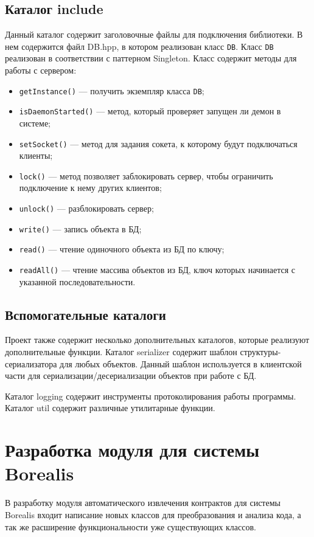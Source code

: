 \subsection{Каталог include}
Данный каталог содержит заголовочные файлы для подключения библиотеки. В нем содержится файл DB.hpp, в котором реализован класс \texttt{DB}. Класс \texttt{DB} реализован в соответствии с паттерном Singleton\cite{patterns}. Класс содержит методы для работы с сервером:
\begin{itemize}
\item \texttt{getInstance()} --- получить экземпляр класса \texttt{DB};
\item \texttt{isDaemonStarted()} --- метод, который проверяет запущен ли демон в системе;
\item \texttt{setSocket()} --- метод для задания сокета, к которому будут подключаться клиенты;
\item \texttt{lock()} --- метод позволяет заблокировать сервер, чтобы ограничить подключение к нему других клиентов;
\item \texttt{unlock()} --- разблокировать сервер;
\item \texttt{write()} --- запись объекта в БД;
\item \texttt{read()} --- чтение одиночного объекта из БД по ключу;
\item \texttt{readAll()} --- чтение массива объектов из БД, ключ которых начинается с указанной последовательности.
\end{itemize}


\subsection{Вспомогательные каталоги}
Проект также содержит несколько дополнительных каталогов, которые реализуют дополнительные функции. Каталог serializer содержит шаблон структуры-сериализатора для любых объектов. Данный шаблон используется в клиентской части для сериализации/десериализации объектов при работе с БД.

Каталог logging содержит инструменты протоколирования работы программы. Каталог util содержит различные утилитарные функции.

\section{Разработка модуля для системы Borealis}
В разработку модуля автоматического извлечения контрактов для системы Borealis входит написание новых классов для преобразования и анализа кода, а так же расширение функциональности уже существующих классов.

